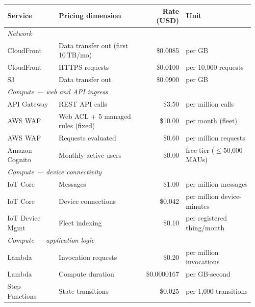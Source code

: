 {
  \centering
  \footnotesize
  \label{tab:pricing-constants}
  \begin{tabular}{llrl}
    \hline
    \textbf{Service} & \textbf{Pricing dimension} & \textbf{Rate (USD)} & \textbf{Unit} \\
    \hline
    \multicolumn{4}{l}{\textit{Network}} \\
    CloudFront          & Data transfer out (first 10\,TB/mo)   & \$0.0085  & per GB \\
    CloudFront          & HTTPS requests                        & \$0.0100  & per 10,000 requests \\
    S3                  & Data transfer out                     & \$0.0900  & per GB \\
    \hline
    \multicolumn{4}{l}{\textit{Compute --- web and API ingress}} \\
    API Gateway         & REST API calls                        & \$3.50    & per million calls \\
    AWS WAF             & Web ACL + 5 managed rules (fixed)     & \$10.00   & per month (fleet) \\
    AWS WAF             & Requests evaluated                    & \$0.60    & per million requests \\
    Amazon Cognito      & Monthly active users                  & \$0.00    & free tier ($\leq$50,000 MAUs) \\
    \hline
    \multicolumn{4}{l}{\textit{Compute --- device connectivity}} \\
    IoT Core            & Messages                              & \$1.00    & per million messages \\
    IoT Core            & Device connections                    & \$0.042   & per million device-minutes \\
    IoT Device Mgmt     & Fleet indexing                        & \$0.10    & per registered thing/month \\
    \hline
    \multicolumn{4}{l}{\textit{Compute --- application logic}} \\
    Lambda              & Invocation requests                   & \$0.20    & per million invocations \\
    Lambda              & Compute duration                      & \$0.0000167 & per GB-second \\
    Step Functions      & State transitions                     & \$0.025   & per 1,000 transitions \\

\end{tabular}}
